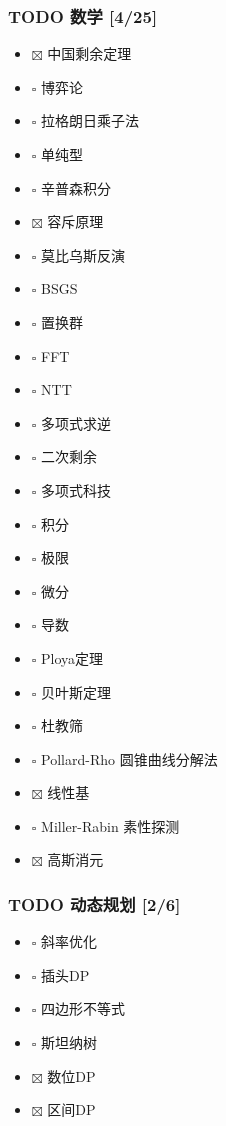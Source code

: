 \documentclass[11pt]{article}
\begin{document}
\subsubsection{{\bfseries\sffamily TODO} 数学 [4/25]}
\label{sec-1-1-3}

\begin{itemize}
\item $\boxtimes$ 中国剩余定理
\item $\square$ 博弈论
\item $\square$ 拉格朗日乘子法
\item $\square$ 单纯型
\item $\square$ 辛普森积分
\item $\boxtimes$ 容斥原理
\item $\square$ 莫比乌斯反演
\item $\square$ BSGS
\item $\square$ 置换群
\item $\square$ FFT
\item $\square$ NTT
\item $\square$ 多项式求逆
\item $\square$ 二次剩余
\item $\square$ 多项式科技
\item $\square$ 积分
\item $\square$ 极限
\item $\square$ 微分
\item $\square$ 导数
\item $\square$ Ploya定理
\item $\square$ 贝叶斯定理
\item $\square$ 杜教筛
\item $\square$ Pollard-Rho 圆锥曲线分解法
\item $\boxtimes$ 线性基
\item $\square$ Miller-Rabin 素性探测
\item $\boxtimes$ 高斯消元
\end{itemize}

\subsubsection{{\bfseries\sffamily TODO} 动态规划 [2/6]}
\label{sec-1-1-4}

\begin{itemize}
\item $\square$ 斜率优化
\item $\square$ 插头DP
\item $\square$ 四边形不等式
\item $\square$ 斯坦纳树
\item $\boxtimes$ 数位DP
\item $\boxtimes$ 区间DP
\end{itemize}
\end{document}
